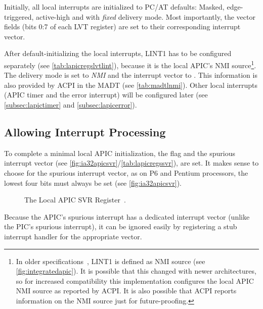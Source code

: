Initially, all local interrupts are initialized to PC/AT defaults: Masked, edge-triggered, active-high and with \textit{fixed} delivery mode.
Most importantly, the vector fields (bits 0:7 of each LVT register) are set to their corresponding interrupt vector.

After default-initializing the local interrupts, LINT1 has to be configured separately (see \autoref{tab:lapicregslvtlint}), because it is the local APIC's NMI source\footnote{
  In older specifications~\autocite{mpspec}, LINT1 is defined as NMI source (see \autoref{fig:integratedapic}).
  It is possible that this changed with newer architectures, so for increased compatibility this implementation configures the local APIC NMI source as reported by ACPI\@.
  It is also possible that ACPI reports information on the NMI source just for future-proofing.}.
The delivery mode is set to \textit{NMI} and the interrupt vector to .
This information is also provided by ACPI in the MADT (see \autoref{tab:madtlnmi}).
Other local interrupts (APIC timer and the error interrupt) will be configured later (see \autoref{subsec:lapictimer} and \autoref{subsec:lapicerror}).

\subsection{Allowing Interrupt Processing}
\label{subsec:lapicsoftenable}

To complete a minimal local APIC initialization, the  flag and the spurious interrupt vector (see \autoref{fig:ia32apicsvr}/\autoref{tab:lapicregssvr}), are set.
It makes sense to choose  for the spurious interrupt vector, as on P6 and Pentium processors, the lowest four bits must always be set (see \autoref{fig:ia32apicsvr}).

\begin{figure}[h]
  \centering
  \begin{subfigure}[b]{0.7\textwidth}
    
  \end{subfigure}
  \caption{The Local APIC SVR Register~\autocite[sec.~3.11.9]{ia32}.}
  \label{fig:ia32apicsvr}
\end{figure}

Because the APIC's spurious interrupt has a dedicated interrupt vector (unlike the PIC's spurious interrupt), it can be ignored easily by registering a stub interrupt handler for the appropriate vector.

